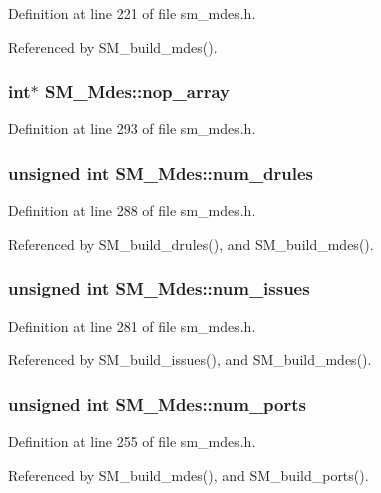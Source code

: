Definition at line 221 of file sm\_\-mdes.h.

Referenced by SM\_\-build\_\-mdes().
\subsubsection{\setlength{\rightskip}{0pt plus 5cm}int$\ast$ \bf{SM\_\-Mdes::nop\_\-array}}\label{structSM__Mdes_95fc72f8c7bc5d1e9ec622cd806fac66}




Definition at line 293 of file sm\_\-mdes.h.
\subsubsection{\setlength{\rightskip}{0pt plus 5cm}unsigned int \bf{SM\_\-Mdes::num\_\-drules}}\label{structSM__Mdes_7aa4b1d1b9393d832a2511ffafb8c3f2}




Definition at line 288 of file sm\_\-mdes.h.

Referenced by SM\_\-build\_\-drules(), and SM\_\-build\_\-mdes().
\subsubsection{\setlength{\rightskip}{0pt plus 5cm}unsigned int \bf{SM\_\-Mdes::num\_\-issues}}\label{structSM__Mdes_a434dbe015bb202d1e247ef4dca2233c}




Definition at line 281 of file sm\_\-mdes.h.

Referenced by SM\_\-build\_\-issues(), and SM\_\-build\_\-mdes().
\subsubsection{\setlength{\rightskip}{0pt plus 5cm}unsigned int \bf{SM\_\-Mdes::num\_\-ports}}\label{structSM__Mdes_b15cc3a6613cf1269e73065c12406d14}




Definition at line 255 of file sm\_\-mdes.h.

Referenced by SM\_\-build\_\-mdes(), and SM\_\-build\_\-ports().
